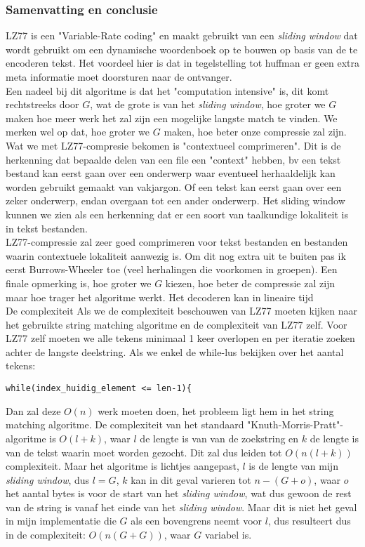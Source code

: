 \documentclass[10pt,a4paper]{report}
\begin{document}
\subsubsection*{Samenvatting en conclusie}
LZ77 is een "Variable-Rate coding" en  maakt gebruikt van een \emph{sliding window} dat wordt gebruikt om een dynamische woordenboek op te bouwen op basis van de te encoderen tekst. Het voordeel hier is dat in tegelstelling tot huffman er geen extra meta informatie moet doorsturen naar de ontvanger.\\

Een nadeel bij dit algoritme is dat het "computation intensive" is, dit komt rechtstreeks door $G$, wat de grote is van het \emph{sliding window}, hoe groter we $G$ maken hoe meer werk het zal zijn een mogelijke langste match te vinden. We merken wel op dat, hoe groter we $G$ maken, hoe beter onze compressie zal zijn.\\

Wat we met LZ77-compresie bekomen is "contextueel comprimeren". Dit is de herkenning dat bepaalde delen van een file een "context" hebben, bv een tekst bestand kan eerst gaan over een onderwerp waar eventueel herhaaldelijk	kan worden gebruikt gemaakt van vakjargon. Of een tekst kan eerst gaan over een zeker onderwerp, endan overgaan tot een ander onderwerp. Het sliding window kunnen we zien als een herkenning dat er een soort van taalkundige lokaliteit is in tekst bestanden.\\

LZ77-compressie zal zeer goed comprimeren voor tekst bestanden en bestanden waarin contextuele lokaliteit aanwezig is. Om dit nog extra uit te buiten pas ik eerst Burrows-Wheeler toe (veel herhalingen die voorkomen in groepen). Een finale opmerking is, hoe groter we $G$ kiezen, hoe beter de compressie zal zijn maar hoe trager het algoritme werkt. Het decoderen kan in lineaire tijd\\

De complexiteit 
Als we de complexiteit beschouwen van LZ77 moeten kijken naar het gebruikte string matching algoritme en de complexiteit van LZ77 zelf.  Voor LZ77 zelf moeten we alle tekens minimaal 1 keer overlopen en per iteratie zoeken achter de langste deelstring. Als we enkel de while-lus bekijken over het aantal tekens:
\begin{lstlisting}
while(index_huidig_element <= len-1){
\end{lstlisting}
Dan zal deze $O(n)$ werk moeten doen, het probleem ligt hem in het string matching algoritme. De complexiteit van het standaard "Knuth-Morris-Pratt"-algoritme is $O(l+k)$, waar $l$ de lengte is van van de zoekstring en $k$ de lengte is van de tekst waarin moet worden gezocht. Dit zal dus leiden tot $O(n(l+k))$ complexiteit. Maar het algoritme is lichtjes aangepast, $l$ is de lengte van mijn \emph{sliding window}, dus $l=G$, $k$ kan in dit geval varieren tot $n-(G+o)$, waar $o$ het aantal bytes is voor de start van het \emph{sliding window}, wat dus gewoon de rest van de string is vanaf het einde van het \emph{sliding window}. Maar dit is niet het geval in mijn implementatie die $G$ als een bovengrens neemt voor $l$, dus resulteert dus in de complexiteit: $O(n(G+G))$, waar $G$ variabel is.
\end{document}
